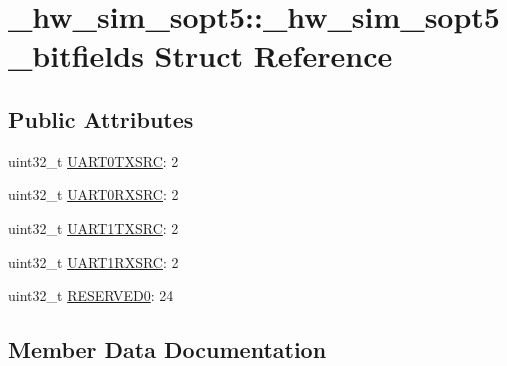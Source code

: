 \hypertarget{struct__hw__sim__sopt5_1_1__hw__sim__sopt5__bitfields}{}\section{\+\_\+hw\+\_\+sim\+\_\+sopt5\+:\+:\+\_\+hw\+\_\+sim\+\_\+sopt5\+\_\+bitfields Struct Reference}
\label{struct__hw__sim__sopt5_1_1__hw__sim__sopt5__bitfields}
\subsection*{Public Attributes}
\begin{DoxyCompactItemize}
\item 
uint32\+\_\+t \hyperlink{struct__hw__sim__sopt5_1_1__hw__sim__sopt5__bitfields_ab9a2e5a65d7fd9904df6de848477c198}{U\+A\+R\+T0\+T\+X\+S\+RC}\+: 2
\item 
uint32\+\_\+t \hyperlink{struct__hw__sim__sopt5_1_1__hw__sim__sopt5__bitfields_a71f0e83647d892211da4988ebcd9c062}{U\+A\+R\+T0\+R\+X\+S\+RC}\+: 2
\item 
uint32\+\_\+t \hyperlink{struct__hw__sim__sopt5_1_1__hw__sim__sopt5__bitfields_af643aa3312b77d2f017d6935618f2888}{U\+A\+R\+T1\+T\+X\+S\+RC}\+: 2
\item 
uint32\+\_\+t \hyperlink{struct__hw__sim__sopt5_1_1__hw__sim__sopt5__bitfields_a919ff4ee1faac818f668d008d13b7d60}{U\+A\+R\+T1\+R\+X\+S\+RC}\+: 2
\item 
uint32\+\_\+t \hyperlink{struct__hw__sim__sopt5_1_1__hw__sim__sopt5__bitfields_afee00286e8f832289c563cf144155453}{R\+E\+S\+E\+R\+V\+E\+D0}\+: 24
\end{DoxyCompactItemize}


\subsection{Member Data Documentation}
